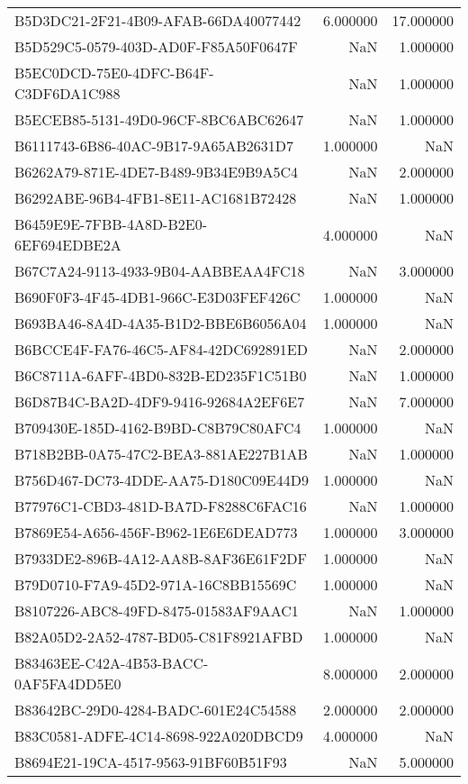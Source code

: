 \begin{tabular}{lrr}
B5D3DC21-2F21-4B09-AFAB-66DA40077442 & 6.000000 & 17.000000 \\
B5D529C5-0579-403D-AD0F-F85A50F0647F & NaN & 1.000000 \\
B5EC0DCD-75E0-4DFC-B64F-C3DF6DA1C988 & NaN & 1.000000 \\
B5ECEB85-5131-49D0-96CF-8BC6ABC62647 & NaN & 1.000000 \\
B6111743-6B86-40AC-9B17-9A65AB2631D7 & 1.000000 & NaN \\
B6262A79-871E-4DE7-B489-9B34E9B9A5C4 & NaN & 2.000000 \\
B6292ABE-96B4-4FB1-8E11-AC1681B72428 & NaN & 1.000000 \\
B6459E9E-7FBB-4A8D-B2E0-6EF694EDBE2A & 4.000000 & NaN \\
B67C7A24-9113-4933-9B04-AABBEAA4FC18 & NaN & 3.000000 \\
B690F0F3-4F45-4DB1-966C-E3D03FEF426C & 1.000000 & NaN \\
B693BA46-8A4D-4A35-B1D2-BBE6B6056A04 & 1.000000 & NaN \\
B6BCCE4F-FA76-46C5-AF84-42DC692891ED & NaN & 2.000000 \\
B6C8711A-6AFF-4BD0-832B-ED235F1C51B0 & NaN & 1.000000 \\
B6D87B4C-BA2D-4DF9-9416-92684A2EF6E7 & NaN & 7.000000 \\
B709430E-185D-4162-B9BD-C8B79C80AFC4 & 1.000000 & NaN \\
B718B2BB-0A75-47C2-BEA3-881AE227B1AB & NaN & 1.000000 \\
B756D467-DC73-4DDE-AA75-D180C09E44D9 & 1.000000 & NaN \\
B77976C1-CBD3-481D-BA7D-F8288C6FAC16 & NaN & 1.000000 \\
B7869E54-A656-456F-B962-1E6E6DEAD773 & 1.000000 & 3.000000 \\
B7933DE2-896B-4A12-AA8B-8AF36E61F2DF & 1.000000 & NaN \\
B79D0710-F7A9-45D2-971A-16C8BB15569C & 1.000000 & NaN \\
B8107226-ABC8-49FD-8475-01583AF9AAC1 & NaN & 1.000000 \\
B82A05D2-2A52-4787-BD05-C81F8921AFBD & 1.000000 & NaN \\
B83463EE-C42A-4B53-BACC-0AF5FA4DD5E0 & 8.000000 & 2.000000 \\
B83642BC-29D0-4284-BADC-601E24C54588 & 2.000000 & 2.000000 \\
B83C0581-ADFE-4C14-8698-922A020DBCD9 & 4.000000 & NaN \\
B8694E21-19CA-4517-9563-91BF60B51F93 & NaN & 5.000000 \\

\end{tabular}
